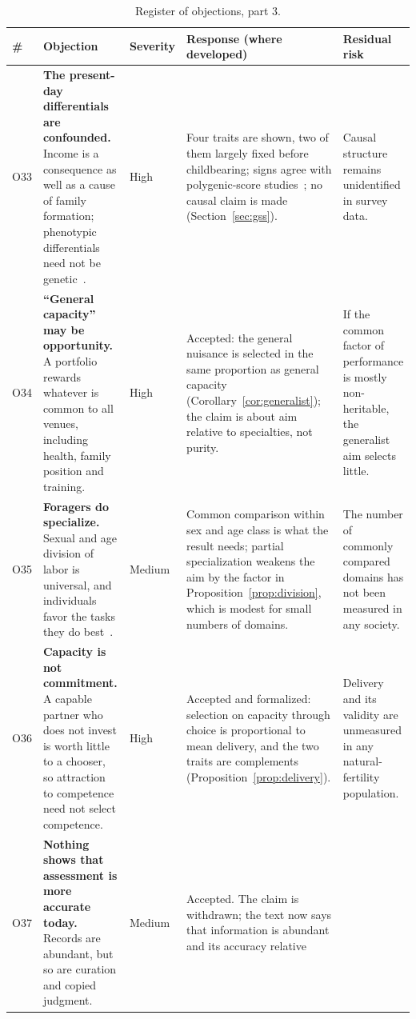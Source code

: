\begin{table}[tp]
\caption{Register of objections, part 3.}\label{tab:redthree}
\scriptsize
\begin{tabularx}{\textwidth}{@{}P{0.028\textwidth}P{0.225\textwidth}P{0.05\textwidth}LP{0.19\textwidth}@{}}
\toprule
\# & Objection & Severity & Response (where developed) & Residual risk\\
\midrule
O33 & \textbf{The present-day differentials are confounded.} Income is a consequence as well as a cause of family formation;
phenotypic differentials need not be genetic~\cite{morrissey2010,kleven2019}. & High & Four traits are shown, two of them largely
fixed before childbearing; signs agree with polygenic-score studies~\cite{kong2017,hughjones2022}; no causal claim is made
(Section~\ref{sec:gss}). & Causal structure remains unidentified in survey data.\\
O34 & \textbf{``General capacity'' may be opportunity.} A portfolio rewards whatever is common to all venues, including
health, family position and training. & High & Accepted: the general nuisance is selected in the same proportion as general
capacity (Corollary~\ref{cor:generalist}); the claim is about aim relative to specialties, not purity. & If the common factor of
performance is mostly non-heritable, the generalist aim selects little.\\
O35 & \textbf{Foragers do specialize.} Sexual and age division of labor is universal, and individuals favor the tasks they do
best~\cite{hooper2015}. & Medium & Common comparison within sex and age class is what the result needs; partial specialization
weakens the aim by the factor in Proposition~\ref{prop:division}, which is modest for small numbers of domains. & The number of
commonly compared domains has not been measured in any society.\\
O36 & \textbf{Capacity is not commitment.} A capable partner who does not invest is worth little to a chooser, so attraction to
competence need not select competence. & High & Accepted and formalized: selection on capacity through choice is proportional to
mean delivery, and the two traits are complements (Proposition~\ref{prop:delivery}). & Delivery and its validity are unmeasured
in any natural-fertility population.\\
O37 & \textbf{Nothing shows that assessment is more accurate today.} Records are abundant, but so are curation and copied
judgment. & Medium & Accepted. The claim is withdrawn; the text now says that information is abundant and its accuracy relative

\end{tabularx}
\end{table}
